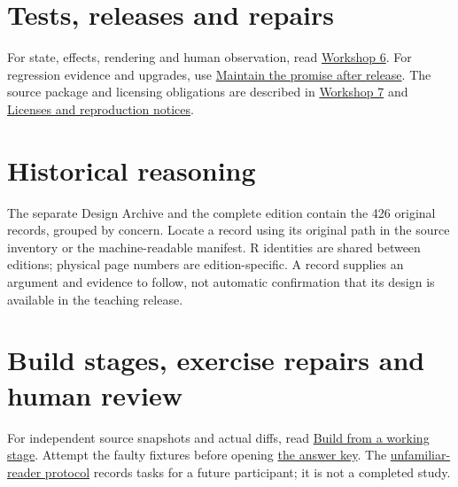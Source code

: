 \section{Tests, releases and repairs}

For state, effects, rendering and human observation, read \hyperref[workshop-06]{Workshop 6}. For regression evidence and upgrades, use \hyperref[teaching-maintenance]{Maintain the promise after release}. The source package and licensing obligations are described in \hyperref[workshop-07]{Workshop 7} and \hyperref[book-licenses]{Licenses and reproduction notices}.

\section{Historical reasoning}

The separate Design Archive and the complete edition contain the 426 original records, grouped by concern. Locate a record using its original path in the source inventory or the machine-readable manifest. R identities are shared between editions; physical page numbers are edition-specific. A record supplies an argument and evidence to follow, not automatic confirmation that its design is available in the teaching release.

\section{Build stages, exercise repairs and human review}

For independent source snapshots and actual diffs, read \hyperref[teaching-build-along]{Build from a working stage}. Attempt the faulty fixtures before opening \hyperref[exercise-answers]{the answer key}. The \hyperref[reader-walkthrough]{unfamiliar-reader protocol} records tasks for a future participant; it is not a completed study.

